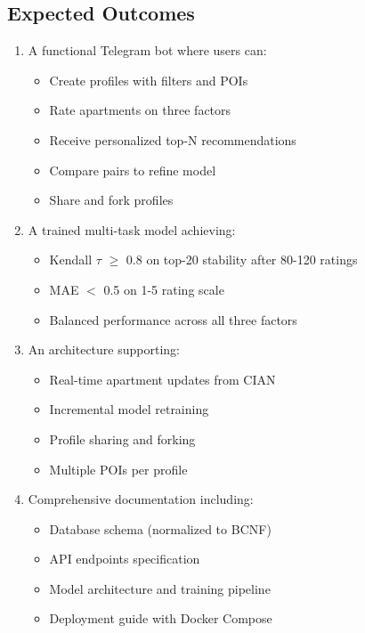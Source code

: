 \documentclass[12pt,a4paper]{article}
\begin{document}
\subsection{Expected Outcomes}

\begin{enumerate}
    \item A functional Telegram bot where users can:
    \begin{itemize}
        \item Create profiles with filters and POIs
        \item Rate apartments on three factors
        \item Receive personalized top-N recommendations
        \item Compare pairs to refine model
        \item Share and fork profiles
    \end{itemize}
    
    \item A trained multi-task model achieving:
    \begin{itemize}
        \item Kendall $\tau$ $\geq$ 0.8 on top-20 stability after 80-120 ratings
        \item MAE $<$ 0.5 on 1-5 rating scale
        \item Balanced performance across all three factors
    \end{itemize}
    
    \item An architecture supporting:
    \begin{itemize}
        \item Real-time apartment updates from CIAN
        \item Incremental model retraining
        \item Profile sharing and forking
        \item Multiple POIs per profile
    \end{itemize}
    
    \item Comprehensive documentation including:
    \begin{itemize}
        \item Database schema (normalized to BCNF)
        \item API endpoints specification
        \item Model architecture and training pipeline
        \item Deployment guide with Docker Compose
    \end{itemize}
\end{enumerate}
\end{document}
